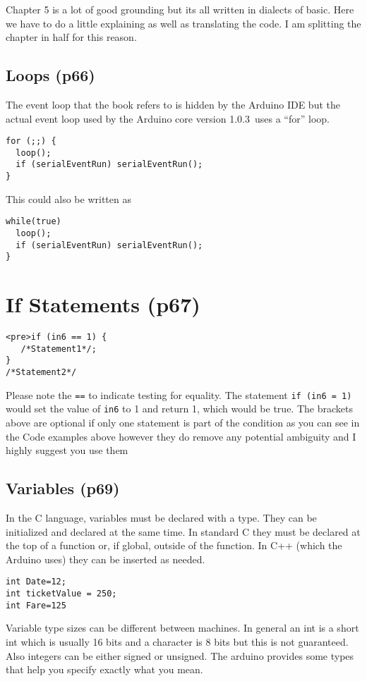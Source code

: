 \documentclass{report}
\begin{document}
{{Chapter 5 is a lot of good grounding but its all written in dialects of basic. Here we have to do a little explaining as well as translating the code. I am splitting the chapter in half for this reason.

\subsection{Loops (p66)}
The event loop that the book refers to is hidden by the Arduino IDE but the actual event loop used by the Arduino core version 1.0.3 uses a ``for'' loop.
\begin{verbatim}
for (;;) {
  loop();
  if (serialEventRun) serialEventRun();
}
\end{verbatim}

This could also be written as
\begin{verbatim}
while(true)
  loop();
  if (serialEventRun) serialEventRun();
}
\end{verbatim}

\section{If Statements (p67)}
\begin{verbatim}
<pre>if (in6 == 1) {
   /*Statement1*/;
}
/*Statement2*/
\end{verbatim}

Please note the \verb|==| to indicate testing for equality. The statement
\verb|if (in6 = 1)|
would set the value of \verb|in6| to 1 and return 1, which would be true.
The brackets above are optional if only one statement is part of the condition as you can see in the Code examples above however they do remove any potential ambiguity and I highly suggest you use them

\subsection{Variables (p69)}
In the C language, variables must be declared with a type. They can be initialized and declared at the same time. In standard C they must be declared at the top of a function or, if global, outside of the function. In C++ (which the Arduino uses) they can be inserted as needed.
\begin{verbatim}
int Date=12;
int ticketValue = 250;
int Fare=125
\end{verbatim}

Variable type sizes can be different between machines. In general an int is a short int which is usually 16 bits and a character is 8 bits but this is not guaranteed. Also integers can be either signed or unsigned. The arduino provides some types that help you specify exactly what you mean.

}}
\end{document}
